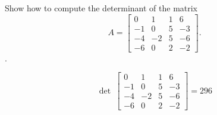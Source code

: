 
\begin{exerciseStatement}


Show how to compute the determinant of the matrix \[A= \left[\begin{array}{cccc}
0 & 1 & 1 & 6 \\
-1 & 0 & 5 & -3 \\
-4 & -2 & 5 & -6 \\
-6 & 0 & 2 & -2
\end{array}\right] .\].


\end{exerciseStatement}
    
\begin{exerciseAnswer} 
\[\operatorname{det}\  \left[\begin{array}{cccc}
0 & 1 & 1 & 6 \\
-1 & 0 & 5 & -3 \\
-4 & -2 & 5 & -6 \\
-6 & 0 & 2 & -2
\end{array}\right] = 296 \]
\end{exerciseAnswer}
    
